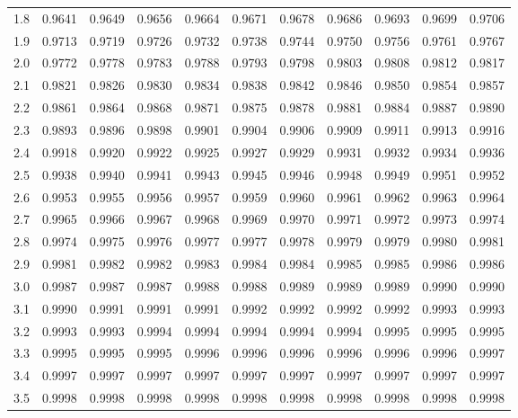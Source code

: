 \begin{mvtable}
{\begin{tabular}{r|*{10}{r}}
1.8 & 0.9641 & 0.9649 & 0.9656 & 0.9664 & 0.9671 & 0.9678 & 0.9686 & 0.9693 & 0.9699 & 0.9706\\
1.9 & 0.9713 & 0.9719 & 0.9726 & 0.9732 & 0.9738 & 0.9744 & 0.9750 & 0.9756 & 0.9761 & 0.9767\\
2.0 & 0.9772 & 0.9778 & 0.9783 & 0.9788 & 0.9793 & 0.9798 & 0.9803 & 0.9808 & 0.9812 & 0.9817\\
2.1 & 0.9821 & 0.9826 & 0.9830 & 0.9834 & 0.9838 & 0.9842 & 0.9846 & 0.9850 & 0.9854 & 0.9857\\
2.2 & 0.9861 & 0.9864 & 0.9868 & 0.9871 & 0.9875 & 0.9878 & 0.9881 & 0.9884 & 0.9887 & 0.9890\\
2.3 & 0.9893 & 0.9896 & 0.9898 & 0.9901 & 0.9904 & 0.9906 & 0.9909 & 0.9911 & 0.9913 & 0.9916\\
2.4 & 0.9918 & 0.9920 & 0.9922 & 0.9925 & 0.9927 & 0.9929 & 0.9931 & 0.9932 & 0.9934 & 0.9936\\
2.5 & 0.9938 & 0.9940 & 0.9941 & 0.9943 & 0.9945 & 0.9946 & 0.9948 & 0.9949 & 0.9951 & 0.9952\\
2.6 & 0.9953 & 0.9955 & 0.9956 & 0.9957 & 0.9959 & 0.9960 & 0.9961 & 0.9962 & 0.9963 & 0.9964\\
2.7 & 0.9965 & 0.9966 & 0.9967 & 0.9968 & 0.9969 & 0.9970 & 0.9971 & 0.9972 & 0.9973 & 0.9974\\
2.8 & 0.9974 & 0.9975 & 0.9976 & 0.9977 & 0.9977 & 0.9978 & 0.9979 & 0.9979 & 0.9980 & 0.9981\\
2.9 & 0.9981 & 0.9982 & 0.9982 & 0.9983 & 0.9984 & 0.9984 & 0.9985 & 0.9985 & 0.9986 & 0.9986\\
3.0 & 0.9987 & 0.9987 & 0.9987 & 0.9988 & 0.9988 & 0.9989 & 0.9989 & 0.9989 & 0.9990 & 0.9990\\
3.1 & 0.9990 & 0.9991 & 0.9991 & 0.9991 & 0.9992 & 0.9992 & 0.9992 & 0.9992 & 0.9993 & 0.9993\\
3.2 & 0.9993 & 0.9993 & 0.9994 & 0.9994 & 0.9994 & 0.9994 & 0.9994 & 0.9995 & 0.9995 & 0.9995\\
3.3 & 0.9995 & 0.9995 & 0.9995 & 0.9996 & 0.9996 & 0.9996 & 0.9996 & 0.9996 & 0.9996 & 0.9997\\
3.4 & 0.9997 & 0.9997 & 0.9997 & 0.9997 & 0.9997 & 0.9997 & 0.9997 & 0.9997 & 0.9997 & 0.9997\\
3.5 & 0.9998 & 0.9998 & 0.9998 & 0.9998 & 0.9998 & 0.9998 & 0.9998 & 0.9998 & 0.9998 & 0.9998\\
\bottomrule
\end{tabular}}
\end{mvtable}
